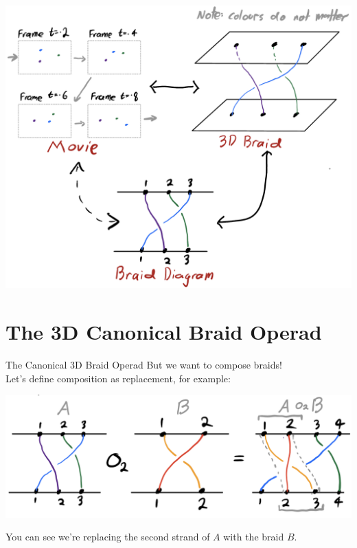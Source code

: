 \documentclass[14pt, xcolor=svgnames]{beamer}
\begin{document}
\begin{frame}
    \begin{center}
        \includegraphics[scale = 0.2]{images/representations of braids.png}
    \end{center}
\end{frame}

\section{The 3D Canonical Braid Operad}

\begin{frame}{The Canonical 3D Braid Operad}
    But we want to compose braids! \\
    Let's define composition as replacement, for example:

    \begin{center}
        \includegraphics[scale = 0.16]{images/composition in the usual braid operad.png}
    \end{center}
    You can see we're replacing the second strand of \( A \) with the braid \( B \). 
    
\end{frame}
\end{document}
